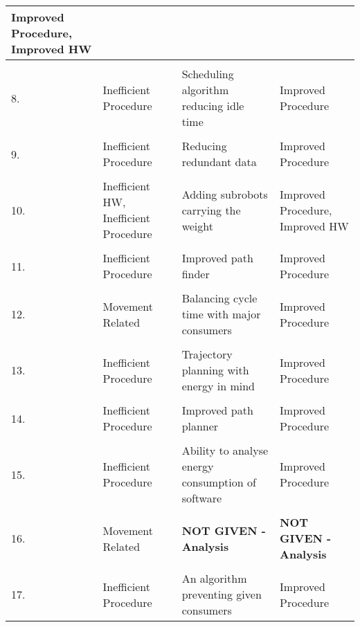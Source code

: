 \begin{table}[h]
\begin{tabular}{p{0.1cm}p{5cm}p{5cm}p{5cm}}
                {Improved Procedure, Improved HW} \\
            \hline
            \\
            {8.} &
                {Inefficient Procedure} &
                {Scheduling algorithm reducing idle time} &
                {Improved Procedure} \\
            \hline
            \\
            {9.} &
                {Inefficient Procedure} &
                {Reducing redundant data} &
                {Improved Procedure} \\
            \hline
            \\
            {10.} &
                {Inefficient HW, Inefficient Procedure} &
                {Adding subrobots carrying the weight} &
                {Improved Procedure, Improved HW} \\
            \hline
            \\
            {11.} &
                {Inefficient Procedure} &
                {Improved path finder} &
                {Improved Procedure} \\
            \hline
            \\
            {12.} &
                {Movement Related} &
                {Balancing cycle time with major consumers} &
                {Improved Procedure} \\
            \hline
            \\
            {13.} &
                {Inefficient Procedure} &
                {Trajectory planning with energy in mind} &
                {Improved Procedure} \\
            \hline
            \\
            {14.} &
                {Inefficient Procedure} &
                {Improved path planner} &
                {Improved Procedure} \\
            \hline
            \\
            {15.} &
                {Inefficient Procedure} &
                {Ability to analyse energy consumption of software} &
                {Improved Procedure} \\
            \hline
            \\
            {16.}  &
                {Movement Related} &
                {\textbf{NOT GIVEN - Analysis}} &
                {\textbf{NOT GIVEN - Analysis}} \\
            \hline
            \\
            {17.}  &
                {Inefficient Procedure} &
                {An algorithm preventing given consumers} &
                {Improved Procedure} \\
        \bottomrule
    \end{tabular}
    \label{table:data_sheet_part_2}
\end{table}